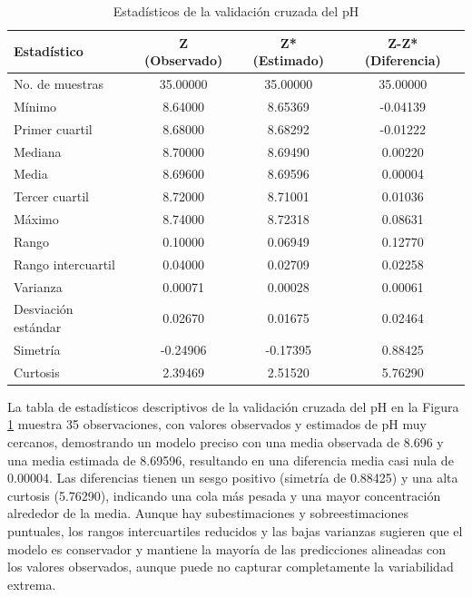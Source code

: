 \begin{table}[!htb]
\centering
\caption{Estadísticos de la validación cruzada del pH}
\label{tab:cross_validation_stats_pH}
\begin{tabular}{lccc}
\hline
\textbf{Estadístico} & \textbf{Z (Observado)} & \textbf{Z* (Estimado)} & \textbf{Z-Z* (Diferencia)} \\ \hline
No. de muestras       & 35.00000 & 35.00000 & 35.00000 \\
Mínimo                & 8.64000  & 8.65369  & -0.04139 \\
Primer cuartil        & 8.68000  & 8.68292  & -0.01222 \\
Mediana               & 8.70000  & 8.69490  & 0.00220  \\
Media                 & 8.69600  & 8.69596  & 0.00004  \\
Tercer cuartil        & 8.72000  & 8.71001  & 0.01036  \\
Máximo                & 8.74000  & 8.72318  & 0.08631  \\
Rango                 & 0.10000  & 0.06949  & 0.12770  \\
Rango intercuartil    & 0.04000  & 0.02709  & 0.02258  \\
Varianza              & 0.00071  & 0.00028  & 0.00061  \\
Desviación estándar   & 0.02670  & 0.01675  & 0.02464  \\
Simetría              & -0.24906 & -0.17395 & 0.88425  \\
Curtosis              & 2.39469  & 2.51520  & 5.76290  \\ \hline
\end{tabular}
\end{table}

 La tabla de estadísticos descriptivos de la validación cruzada del pH en la Figura \ref{tab:cross_validation_stats_pH} muestra 35 observaciones, con valores observados y estimados de pH muy cercanos, demostrando un modelo preciso con una media observada de 8.696 y una media estimada de 8.69596, resultando en una diferencia media casi nula de 0.00004. Las diferencias tienen un sesgo positivo (simetría de 0.88425) y una alta curtosis (5.76290), indicando una cola más pesada y una mayor concentración alrededor de la media. Aunque hay subestimaciones y sobreestimaciones puntuales, los rangos intercuartiles reducidos y las bajas varianzas sugieren que el modelo es conservador y mantiene la mayoría de las predicciones alineadas con los valores observados, aunque puede no capturar completamente la variabilidad extrema.



